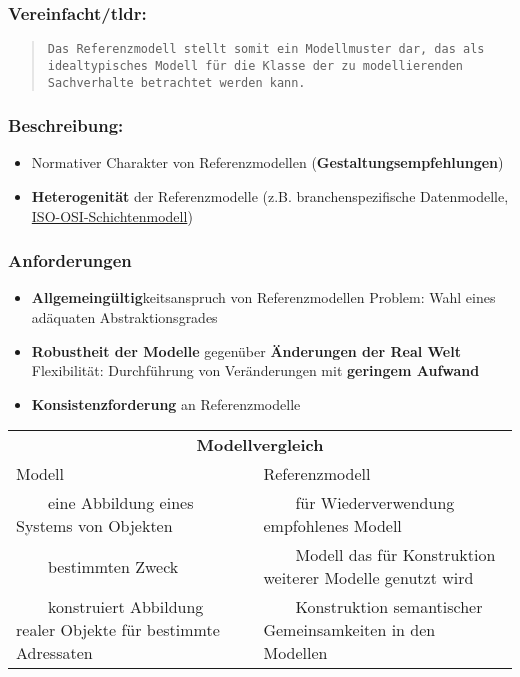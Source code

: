 \documentclass[a4paper]{article}
\newcommand{\tabitem}{~~\llap{\textbullet}~~}
\begin{document}
\subsubsection*{Vereinfacht/tldr:}
\begin{quote}
	\texttt{Das Referenzmodell stellt somit ein Modellmuster dar, das als idealtypisches Modell für die Klasse der zu modellierenden Sachverhalte betrachtet werden kann.}
\end{quote}

\subsubsection*{Beschreibung:}
\begin{itemize}
	\item Normativer Charakter von Referenzmodellen (\textbf{Gestaltungsempfehlungen})
	\item \textbf{Heterogenität} der Referenzmodelle (z.B. branchenspezifische Datenmodelle, \hyperref{https://en.wikipedia.org/wiki/OSI_model}{}{}{ISO-OSI-Schichtenmodell})
\end{itemize}

\subsubsection*{Anforderungen}
\begin{itemize}
	\item \textbf{Allgemeingültig}keitsanspruch von Referenzmodellen
	\subitem Problem: Wahl eines adäquaten Abstraktionsgrades
	\item \textbf{Robustheit der Modelle} gegenüber \textbf{Änderungen der Real Welt}
	\subitem Flexibilität: Durchführung von Veränderungen mit \textbf{geringem Aufwand}
	\item \textbf{Konsistenzforderung} an Referenzmodelle
\end{itemize}

\begin{adjustbox}{max width=\linewidth}
\begin{tabular}{l|l}
	\toprule
	\multicolumn{2}{c}{\textbf{Modellvergleich}} \\[.5\normalbaselineskip]
	Modell & Referenzmodell \\
	\midrule
	\tabitem eine Abbildung eines Systems von Objekten & \tabitem für Wiederverwendung empfohlenes Modell \\
	\tabitem bestimmten Zweck & \tabitem Modell das für Konstruktion weiterer Modelle genutzt wird \\
	\tabitem konstruiert Abbildung realer Objekte für bestimmte Adressaten & \tabitem Konstruktion semantischer Gemeinsamkeiten in den Modellen \\
	\bottomrule
\end{tabular}
\end{adjustbox}
\\[1\normalbaselineskip]
\end{document}
